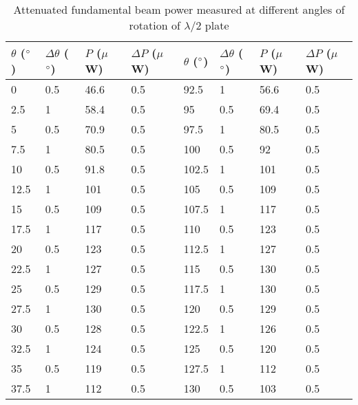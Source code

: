 \begin{table}[]
\centering
\caption{Attenuated fundamental beam power measured at different angles of rotation of $\lambda /2$ plate}
\label{tab:variabattcalib}
\begin{tabular}{|l|l|l|l||l|l|l|l|}
\hline
$\theta$ ($\degree$) & $\Delta \theta$ ($\degree$) & $P$ ($\mu$W) & $\Delta P$ ($\mu$W) & $\theta$ ($\degree$) & $\Delta \theta$ ($\degree$) & $P$ ($\mu$W) & $\Delta P$ ($\mu$W) \\ \hline
0     & 0.5         & 46.6    & 0.5     & 92.5  & 1           & 56.6    & 0.5     \\ \hline
2.5   & 1           & 58.4    & 0.5     & 95    & 0.5         & 69.4    & 0.5     \\ \hline
5     & 0.5         & 70.9    & 0.5     & 97.5  & 1           & 80.5    & 0.5     \\ \hline
7.5   & 1           & 80.5    & 0.5     & 100   & 0.5         & 92      & 0.5     \\ \hline
10    & 0.5         & 91.8    & 0.5     & 102.5 & 1           & 101     & 0.5     \\ \hline
12.5  & 1           & 101     & 0.5     & 105   & 0.5         & 109     & 0.5     \\ \hline
15    & 0.5         & 109     & 0.5     & 107.5 & 1           & 117     & 0.5     \\ \hline
17.5  & 1           & 117     & 0.5     & 110   & 0.5         & 123     & 0.5     \\ \hline
20    & 0.5         & 123     & 0.5     & 112.5 & 1           & 127     & 0.5     \\ \hline
22.5  & 1           & 127     & 0.5     & 115   & 0.5         & 130     & 0.5     \\ \hline
25    & 0.5         & 129     & 0.5     & 117.5 & 1           & 130     & 0.5     \\ \hline
27.5  & 1           & 130     & 0.5     & 120   & 0.5         & 129     & 0.5     \\ \hline
30    & 0.5         & 128     & 0.5     & 122.5 & 1           & 126     & 0.5     \\ \hline
32.5  & 1           & 124     & 0.5     & 125   & 0.5         & 120     & 0.5     \\ \hline
35    & 0.5         & 119     & 0.5     & 127.5 & 1           & 112     & 0.5     \\ \hline
37.5  & 1           & 112     & 0.5     & 130   & 0.5         & 103     & 0.5     \\ \hline

\end{tabular}
\end{table}
